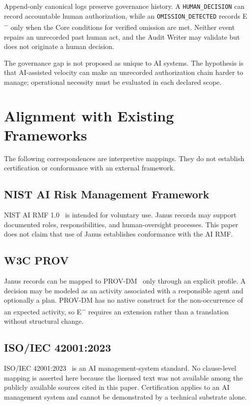 \documentclass[conference]{IEEEtran}
\begin{document}
Append-only canonical logs preserve governance history. A
\texttt{HUMAN\_DECISION} can record accountable human authorization, while an
\texttt{OMISSION\_DETECTED} records E\textsuperscript{$-$} only when the Core
conditions for verified omission are met. Neither event repairs an unrecorded
past human act, and the Audit Writer may validate but does not originate a human
decision.

The governance gap is not proposed as unique to AI systems. The hypothesis is
that AI-assisted velocity can make an unrecorded authorization chain harder to
manage; operational necessity must be evaluated in each declared scope.

\section{Alignment with Existing Frameworks}

The following correspondences are interpretive mappings. They do not establish
certification or conformance with an external framework.

\subsection{NIST AI Risk Management Framework}

NIST AI RMF 1.0~\cite{nist2023} is intended for voluntary use. Janus records may
support documented roles, responsibilities, and human-oversight processes. This
paper does not claim that use of Janus establishes conformance with the AI RMF.

\subsection{W3C PROV}

Janus records can be mapped to PROV-DM~\cite{w3c_prov} only through an explicit
profile. A decision may be modeled as an activity associated with a responsible
agent and optionally a plan. PROV-DM has no native construct for the
non-occurrence of an expected activity, so E\textsuperscript{$-$} requires an
extension rather than a translation without structural change.

\subsection{ISO/IEC 42001:2023}

ISO/IEC 42001:2023~\cite{iso42001} is an AI management-system standard. No
clause-level mapping is asserted here because the licensed text was not
available among the publicly available sources cited in this paper.
Certification applies to an AI
management system and cannot be demonstrated by a technical substrate alone.
\end{document}
